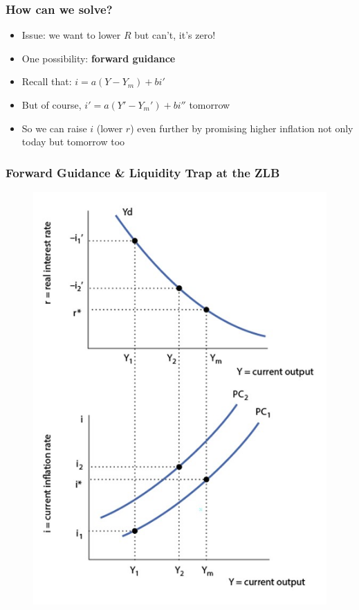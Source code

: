 \documentclass{beamer}
\begin{document}
\begin{frame}
\frametitle[alignment=center]{How can we solve?}
\begin{itemize}
\item Issue:  we want to lower $R$ but can't, it's zero!
\bigskip
\item One possibility: \textbf{forward guidance}
\bigskip
\item Recall that: $i=a(Y-Y_m)+bi'$
\bigskip
\item But of course, $i'=a(Y'-Y_m')+bi''$ tomorrow
\bigskip
\item So we can raise $i$ (lower $r$) even further by promising higher inflation not only today but tomorrow too
\end{itemize}
\end{frame}



\begin{frame}
\frametitle[alignment=center]{Forward Guidance \& Liquidity Trap at the ZLB}
\begin{figure}
\centering
\includegraphics[scale=0.5]{Figures/W_Fig_15pt7.png}
\end{figure}
\end{frame}
\end{document}
